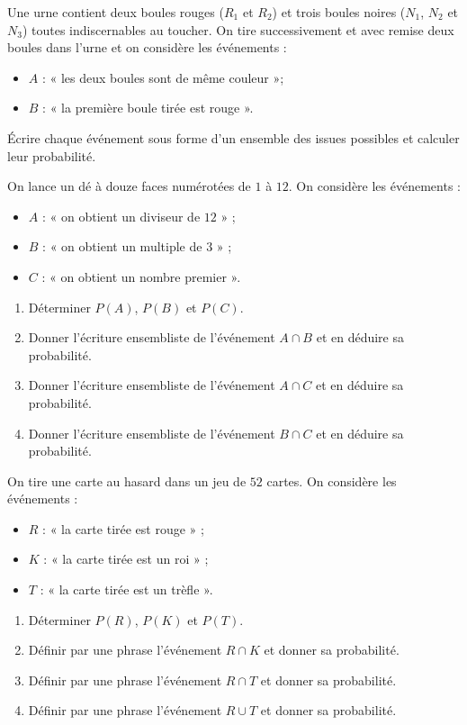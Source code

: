 \documentclass[11pt]{article}
\begin{document}
\begin{exo}
  Une urne contient deux boules rouges ($R_1$ et $R_2$) et trois boules noires
  ($N_1$, $N_2$ et $N_3$) toutes indiscernables au toucher. On tire
  successivement et avec remise deux boules dans l'urne et on considère les
  événements :
  \begin{itemize}
    \item $A$ : « les deux boules sont de même couleur »;
    \item $B$ : « la première boule tirée est rouge ».
  \end{itemize}
  Écrire chaque événement sous forme d'un ensemble des issues possibles et
  calculer leur probabilité.
\end{exo}

\begin{exo}
  On lance un dé à douze faces numérotées de $1$ à $12$. On considère les
  événements :
  \begin{itemize}
    \item $A$ : « on obtient un diviseur de $12$ » ;
    \item $B$ : « on obtient un multiple de $3$ » ;
    \item $C$ : « on obtient un nombre premier ».
  \end{itemize}
  \begin{enumerate}
    \item Déterminer $P(A)$, $P(B)$ et $P(C)$.
    \item Donner l'écriture ensembliste de l'événement $A\cap B$ et en déduire
      sa probabilité.
    \item Donner l'écriture ensembliste de l'événement $A\cap C$ et en déduire
      sa probabilité.
    \item Donner l'écriture ensembliste de l'événement $B\cap C$ et en déduire
      sa probabilité.
  \end{enumerate}
\end{exo}

\begin{exo}
  On tire une carte au hasard dans un jeu de $52$ cartes. On considère les
  événements :
  \begin{itemize}
    \item $R$ : « la carte tirée est rouge » ;
    \item $K$ : « la carte tirée est un roi » ;
    \item $T$ : « la carte tirée est un trèfle ».
  \end{itemize}
  \begin{enumerate}
    \item Déterminer $P(R)$, $P(K)$ et $P(T)$.
    \item Définir par une phrase l'événement $R\cap K$ et donner sa probabilité.
    \item Définir par une phrase l'événement $R\cap T$ et donner sa probabilité.
    \item Définir par une phrase l'événement $R\cup T$ et donner sa probabilité.
  \end{enumerate}
\end{exo}
\end{document}
